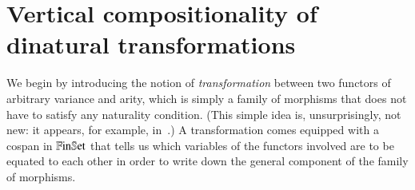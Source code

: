 \section{Vertical compositionality of dinatural transformations}\label{section vertical compositionality}

%
We begin by introducing the notion of \emph{transformation} between two functors of arbitrary variance and arity, which is simply a family of morphisms that does not have to satisfy any naturality condition. (This simple idea is, unsurprisingly, not new: it appears, for example, in~\cite{power_premonoidal_1997}.) A transformation comes equipped with a cospan in $\mathbb{F}\mathrm{in}\mathbb{S}\mathrm{et}$ that tells us which variables of the functors involved are to be equated to each other in order to write down the general component of the family of morphisms. 

